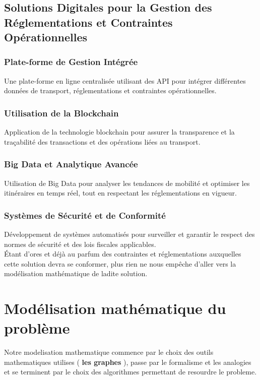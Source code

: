 \documentclass{article}
\begin{document}
\subsection{Solutions Digitales pour la Gestion des Réglementations et Contraintes Opérationnelles}

\subsubsection*{Plate-forme de Gestion Intégrée}
Une plate-forme en ligne centralisée utilisant des API pour intégrer différentes données de transport, réglementations et contraintes opérationnelles.

\subsubsection*{Utilisation de la Blockchain}
Application de la technologie blockchain pour assurer la transparence et la traçabilité des transactions et des opérations liées au transport.

\subsubsection*{Big Data et Analytique Avancée}
Utilisation de Big Data pour analyser les tendances de mobilité et optimiser les itinéraires en temps réel, tout en respectant les réglementations en vigueur.

\subsubsection*{Systèmes de Sécurité et de Conformité}
Développement de systèmes automatisés pour surveiller et garantir le respect des normes de sécurité et des lois fiscales applicables.
\\
Étant d'ores et déjà au parfum des contraintes et réglementations auxquelles cette solution devra se conformer, plus rien ne nous empêche d'aller vers la modélisation mathématique de ladite solution.


\section{Modélisation mathématique du problème}
Notre modelisation mathematique commence par le choix des outils mathematiques utilises ( \textbf{les graphes} ),
passe par le formalisme et les analogies et se terminent par le choix des algorithmes permettant de resourdre le probleme.\\
\end{document}
